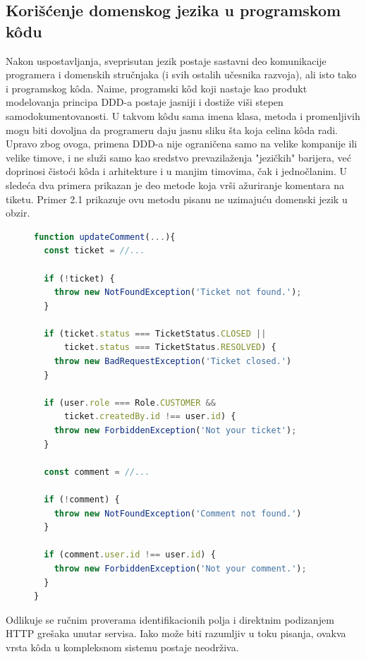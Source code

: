 \documentclass[12pt,oneside]{memoir}
\begin{document}
\subsection{Korišćenje domenskog jezika u programskom k\^{o}du}
\label{sec:dddukodu}
Nakon uspostavljanja, sveprisutan jezik postaje sastavni deo komunikacije programera i domenskih stručnjaka (i svih ostalih učesnika razvoja), ali isto tako i programskog k\^{o}da. Naime, programski k\^{o}d koji nastaje kao produkt modelovanja principa DDD-a postaje jasniji i dostiže viši stepen samodokumentovanosti. U takvom k\^{o}du sama imena klasa, metoda i promenljivih mogu biti dovoljna da programeru daju jasnu sliku šta koja celina k\^{o}da radi. Upravo zbog ovoga, primena DDD-a nije ograničena samo na velike kompanije ili velike timove, i ne služi samo kao sredstvo prevazilaženja "jezičkih" barijera, već doprinosi čistoći k\^{o}da i arhitekture i u manjim timovima, čak i jednočlanim. U sledeća dva primera prikazan je deo metode koja vrši ažuriranje komentara na tiketu. Primer 2.1 prikazuje ovu metodu pisanu ne uzimajuću domenski jezik u obzir.


\begin{figure}[h]
\begin{lstlisting}[language=JavaScript, style=ES6, caption={K\^{o}d koji nije na domenskom jeziku}]
function updateComment(...){
  const ticket = //...
  
  if (!ticket) {
    throw new NotFoundException('Ticket not found.');
  }

  if (ticket.status === TicketStatus.CLOSED ||
      ticket.status === TicketStatus.RESOLVED) {
    throw new BadRequestException('Ticket closed.')
  }

  if (user.role === Role.CUSTOMER &&
      ticket.createdBy.id !== user.id) {
    throw new ForbiddenException('Not your ticket');
  }
  
  const comment = //...
  
  if (!comment) {
    throw new NotFoundException('Comment not found.')
  }
  
  if (comment.user.id !== user.id) {
    throw new ForbiddenException('Not your comment.');
  }
}
\end{lstlisting}
\end{figure}
\newpage
Odlikuje se ručnim proverama identifikacionih polja i direktnim podizanjem HTTP grešaka unutar servisa. Iako može biti razumljiv u toku pisanja, ovakva vrsta k\^{o}da u kompleksnom sistemu postaje neodrživa.
\end{document}
